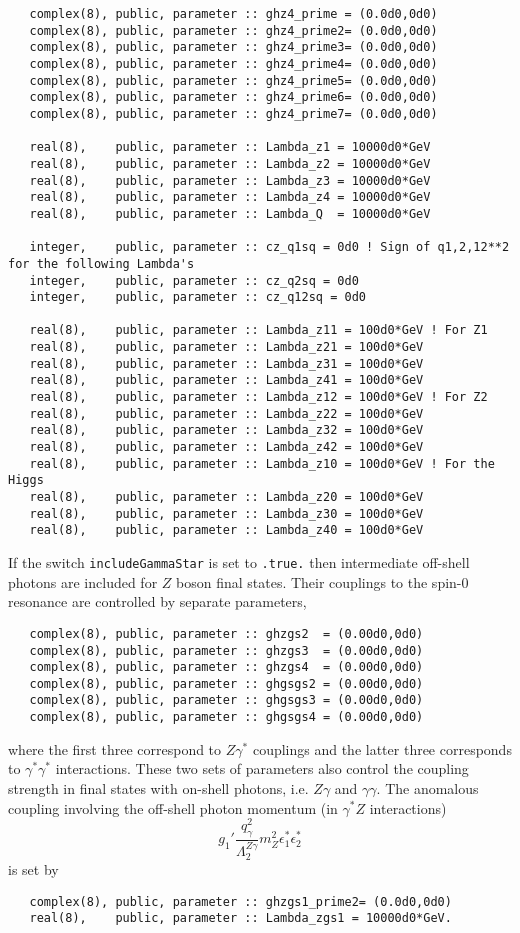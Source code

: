 \documentclass[aps,superscriptaddress,nofootinbib]{revtex4}
\begin{document}
\begin{verbatim}
   complex(8), public, parameter :: ghz4_prime = (0.0d0,0d0)
   complex(8), public, parameter :: ghz4_prime2= (0.0d0,0d0)
   complex(8), public, parameter :: ghz4_prime3= (0.0d0,0d0)
   complex(8), public, parameter :: ghz4_prime4= (0.0d0,0d0)
   complex(8), public, parameter :: ghz4_prime5= (0.0d0,0d0)
   complex(8), public, parameter :: ghz4_prime6= (0.0d0,0d0)
   complex(8), public, parameter :: ghz4_prime7= (0.0d0,0d0)

   real(8),    public, parameter :: Lambda_z1 = 10000d0*GeV
   real(8),    public, parameter :: Lambda_z2 = 10000d0*GeV
   real(8),    public, parameter :: Lambda_z3 = 10000d0*GeV
   real(8),    public, parameter :: Lambda_z4 = 10000d0*GeV
   real(8),    public, parameter :: Lambda_Q  = 10000d0*GeV
   
   integer,    public, parameter :: cz_q1sq = 0d0 ! Sign of q1,2,12**2 for the following Lambda's
   integer,    public, parameter :: cz_q2sq = 0d0
   integer,    public, parameter :: cz_q12sq = 0d0
   
   real(8),    public, parameter :: Lambda_z11 = 100d0*GeV ! For Z1
   real(8),    public, parameter :: Lambda_z21 = 100d0*GeV
   real(8),    public, parameter :: Lambda_z31 = 100d0*GeV
   real(8),    public, parameter :: Lambda_z41 = 100d0*GeV
   real(8),    public, parameter :: Lambda_z12 = 100d0*GeV ! For Z2
   real(8),    public, parameter :: Lambda_z22 = 100d0*GeV
   real(8),    public, parameter :: Lambda_z32 = 100d0*GeV
   real(8),    public, parameter :: Lambda_z42 = 100d0*GeV
   real(8),    public, parameter :: Lambda_z10 = 100d0*GeV ! For the Higgs
   real(8),    public, parameter :: Lambda_z20 = 100d0*GeV
   real(8),    public, parameter :: Lambda_z30 = 100d0*GeV
   real(8),    public, parameter :: Lambda_z40 = 100d0*GeV         
\end{verbatim}

If the switch \verb|includeGammaStar| is set to \verb|.true.| then intermediate off-shell photons are included for $Z$ boson final states.
Their couplings to the spin-0 resonance are controlled by separate parameters,
\begin{verbatim}
   complex(8), public, parameter :: ghzgs2  = (0.00d0,0d0)
   complex(8), public, parameter :: ghzgs3  = (0.00d0,0d0)
   complex(8), public, parameter :: ghzgs4  = (0.00d0,0d0)
   complex(8), public, parameter :: ghgsgs2 = (0.00d0,0d0)
   complex(8), public, parameter :: ghgsgs3 = (0.00d0,0d0)
   complex(8), public, parameter :: ghgsgs4 = (0.00d0,0d0)
\end{verbatim}
where the first three correspond to $Z\gamma^*$ couplings and the latter three corresponds to $\gamma^* \gamma^*$ interactions.
These two sets of parameters also control the coupling strength in final states with on-shell photons, i.e. $Z\gamma$ and $\gamma\gamma$.
The anomalous coupling involving the off-shell photon momentum (in $\gamma^* Z$ interactions)
\[
g_1' \frac{ q^2_\gamma }{ \Lambda_2^{Z\gamma} } m_Z^2 \epsilon^*_1 \epsilon^*_2
\]
is set by
\begin{verbatim}
   complex(8), public, parameter :: ghzgs1_prime2= (0.0d0,0d0)
   real(8),    public, parameter :: Lambda_zgs1 = 10000d0*GeV.
\end{verbatim}
\end{document}
